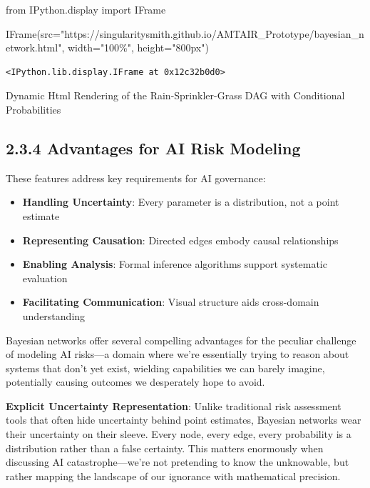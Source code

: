 \documentclass[
  11pt,
  letterpaper,
]{book}
\newenvironment{Shaded}{\begin{snugshade}}{\end{snugshade}}
\newcommand{\ImportTok}[1]{\textcolor[rgb]{0.00,0.46,0.62}{#1}}
\newcommand{\NormalTok}[1]{\textcolor[rgb]{0.00,0.23,0.31}{#1}}
\newcommand{\OperatorTok}[1]{\textcolor[rgb]{0.37,0.37,0.37}{#1}}
\newcommand{\StringTok}[1]{\textcolor[rgb]{0.13,0.47,0.30}{#1}}
\providecommand{\tightlist}{%
  \setlength{\itemsep}{0pt}\setlength{\parskip}{0pt}}
\begin{document}
\begin{Shaded}
\begin{Highlighting}[]
\ImportTok{from}\NormalTok{ IPython.display }\ImportTok{import}\NormalTok{ IFrame}

\NormalTok{IFrame(src}\OperatorTok{=}\StringTok{"https://singularitysmith.github.io/AMTAIR\_Prototype/bayesian\_network.html"}\NormalTok{, width}\OperatorTok{=}\StringTok{"100\%"}\NormalTok{, height}\OperatorTok{=}\StringTok{"800px"}\NormalTok{)}
\end{Highlighting}
\end{Shaded}

\label{rain_sprinkler_grass_example_network_rendering}
\begin{verbatim}
<IPython.lib.display.IFrame at 0x12c32b0d0>
\end{verbatim}

Dynamic Html Rendering of the Rain-Sprinkler-Grass DAG with Conditional
Probabilities

\subsection{2.3.4 Advantages for AI Risk
Modeling}\label{sec-modeling-advantages}

These features address key requirements for AI governance:

\begin{itemize}
\tightlist
\item
  \textbf{Handling Uncertainty}: Every parameter is a distribution, not
  a point estimate
\item
  \textbf{Representing Causation}: Directed edges embody causal
  relationships
\item
  \textbf{Enabling Analysis}: Formal inference algorithms support
  systematic evaluation
\item
  \textbf{Facilitating Communication}: Visual structure aids
  cross-domain understanding
\end{itemize}

Bayesian networks offer several compelling advantages for the peculiar
challenge of modeling AI risks---a domain where we're essentially trying
to reason about systems that don't yet exist, wielding capabilities we
can barely imagine, potentially causing outcomes we desperately hope to
avoid.

\textbf{Explicit Uncertainty Representation}: Unlike traditional risk
assessment tools that often hide uncertainty behind point estimates,
Bayesian networks wear their uncertainty on their sleeve. Every node,
every edge, every probability is a distribution rather than a false
certainty. This matters enormously when discussing AI
catastrophe---we're not pretending to know the unknowable, but rather
mapping the landscape of our ignorance with mathematical precision.
\end{document}
